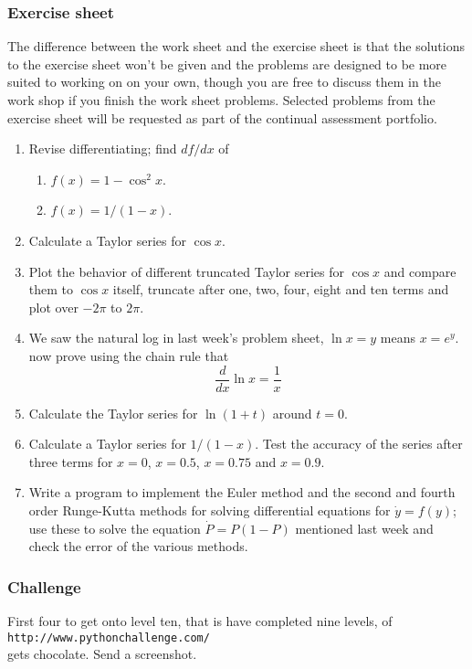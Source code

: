 \documentclass[12pt]{article}
\begin{document}
\subsubsection*{Exercise sheet}

The difference between the work sheet and the exercise sheet is that
the solutions to the exercise sheet won't be given and the problems
are designed to be more suited to working on on your own, though you
are free to discuss them in the work shop if you finish the work sheet
problems. Selected problems from the exercise sheet will be requested
as part of the continual assessment portfolio.

\begin{enumerate}

\item Revise differentiating; find $df/dx$ of
\begin{enumerate}
\item $f(x)=1-\cos^2{x}$.
\item $f(x)=1/(1-x)$.
\end{enumerate}

\item Calculate a Taylor series for $\cos{x}$. 

\item Plot the behavior of different truncated Taylor series for
  $\cos{x}$ and compare them to $\cos{x}$ itself, truncate after one,
  two, four, eight and ten terms and plot over $-2\pi$ to $2\pi$.

\item We saw the natural log in last week's problem sheet, $\ln{x}=y$
  means $x=e^y$. now prove using the chain rule that
\begin{equation}
\frac{d}{dx}\ln{x}=\frac{1}{x}
\end{equation}

\item Calculate the Taylor series for $\ln{(1+t)}$ around $t=0$.

\item Calculate a Taylor series for $1/(1-x)$. Test the accuracy of the
  series after three terms for $x=0$, $x=0.5$, $x=0.75$ and $x=0.9$.

\item Write a program to implement the Euler method and the second and
  fourth order Runge-Kutta methods for solving differential equations
  for $\dot{y}=f(y)$; use these to solve the equation $\dot{P}=P(1-P)$
  mentioned last week and check the error of the various methods.

\end{enumerate}

\subsubsection*{Challenge}
First four to get onto level ten, that is have completed nine levels, of\\ 
\texttt{http://www.pythonchallenge.com/}\\ gets chocolate. Send a screenshot. 
\end{document}

